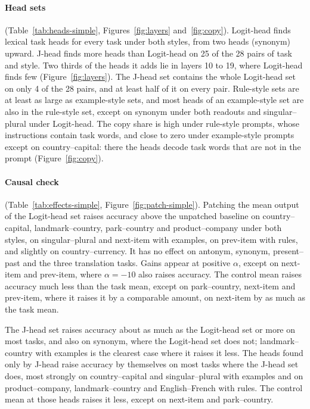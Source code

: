 \documentclass[11pt,a4paper]{article}
\begin{document}
\paragraph{Head sets} (Table~\ref{tab:heads-simple}, Figures~\ref{fig:layers} and~\ref{fig:copy}). Logit-head finds lexical task heads for every task under both styles, from two heads (synonym) upward. J-head finds more heads than Logit-head on 25 of the 28 pairs of task and style. Two thirds of the heads it adds lie in layers 10 to 19, where Logit-head finds few (Figure~\ref{fig:layers}). The J-head set contains the whole Logit-head set on only 4 of the 28 pairs, and at least half of it on every pair. Rule-style sets are at least as large as example-style sets, and most heads of an example-style set are also in the rule-style set, except on synonym under both readouts and singular--plural under Logit-head. The copy share is high under rule-style prompts, whose instructions contain task words, and close to zero under example-style prompts except on country--capital: there the heads decode task words that are not in the prompt (Figure~\ref{fig:copy}).

\paragraph{Causal check} (Table~\ref{tab:effects-simple}, Figure~\ref{fig:patch-simple}). Patching the mean output of the Logit-head set raises accuracy above the unpatched baseline on country--capital, landmark--country, park--country and product--company under both styles, on singular--plural and next-item with examples, on prev-item with rules, and slightly on country--currency. It has no effect on antonym, synonym, present--past and the three translation tasks. Gains appear at positive $\alpha$, except on next-item and prev-item, where $\alpha=-10$ also raises accuracy. The control mean raises accuracy much less than the task mean, except on park--country, next-item and prev-item, where it raises it by a comparable amount, on next-item by as much as the task mean.

The J-head set raises accuracy about as much as the Logit-head set or more on most tasks, and also on synonym, where the Logit-head set does not; landmark--country with examples is the clearest case where it raises it less. The heads found only by J-head raise accuracy by themselves on most tasks where the J-head set does, most strongly on country--capital and singular--plural with examples and on product--company, landmark--country and English--French with rules. The control mean at those heads raises it less, except on next-item and park--country.
\end{document}
